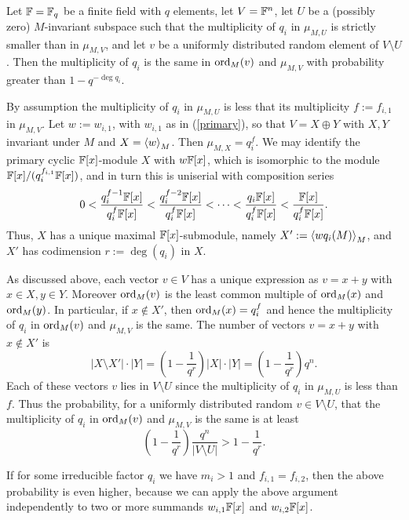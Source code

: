 \begin{Prop}
\label{ProbOneMult}
Let $\mathbb{F} = \mathbb{F}_q$ be a finite field with $q$ elements, let $V=\mathbb{F}^n$, let
$U$ be a (possibly zero) $M$-invariant subspace such that the multiplicity of
$q_i$ in $\mu_{M,U}$ is strictly smaller than in $\mu_{M,V}$, and let 
$v$ be a uniformly distributed random element of $V\setminus U$. Then 
the multiplicity of $q_i$ is the same in $\mathrm{ord}_M(v)$ and $\mu_{M,V}$ 
with probability greater than
$1-q^{-\deg q_i}$.
\end{Prop}
\proofbeg
By assumption the multiplicity of $q_i$ in $\mu_{M,U}$ 
is less that its multiplicity $f:=f_{i,1}$ in $\mu_{M,V}$. 
Let $w:=w_{i,1}$, with $w_{i,1}$ as in (\ref{primary}), so that $V=X\oplus Y$ with
$X, Y$ invariant under $M$ and $X=\left< w\right>_M$. Then $\mu_{M,X}=
q_i^{f}$. We may identify the primary cyclic $\mathbb{F}[x]$-module 
$X$ with  $w\mathbb{F}[x]$, which is
isomorphic to the module $\mathbb{F}[x]/(q_i^{f_{i,1}}\mathbb{F}[x])$,
and in turn this is uniserial with composition series
\[ 
0 <   \frac{q_i^{f-1}\mathbb{F}[x]}{q_i^{f}\mathbb{F}[x]}
     <   \frac{q_i^{f-2}\mathbb{F}[x]}{q_i^{f}\mathbb{F}[x]} <
\cdots <  \frac{q_i\mathbb{F}[x]}{q_i^{f}\mathbb{F}[x]} 
       < \frac{\mathbb{F}[x]}{q_i^{f}\mathbb{F}[x]}. 
\]
Thus, $X$ has a unique maximal $\mathbb{F}[x]$-submodule, namely  $X':=\left< w q_i(M)\right>_M$,
and $X'$ has codimension $r:=\deg(q_i)$ in $X$. 

As discussed above, each vector $v\in V$ has a 
unique expression as $v=x+y$ with $x\in X, y\in Y$. Moreover
$\mathrm{ord}_M(v)$ is the least common multiple of $\mathrm{ord}_M(x)$ and $\mathrm{ord}_M(y)$.
In particular, if $x\not\in X'$, then $\mathrm{ord}_M(x)=q_i^{f}$ and hence
the multiplicity of $q_i$ in $\mathrm{ord}_M(v)$ and $\mu_{M,V}$ is the same.
The number of vectors $v=x+y$ with $x\not\in X'$ is 
\[
|X\setminus X'|\cdot |Y|=(1-\frac{1}{q^r})|X|\cdot|Y|=(1-\frac{1}{q^r})q^n.
\]
Each of these vectors $v$ lies in $V\setminus U$ since the multiplicity of
$q_i$ in $\mu_{M,U}$ is less than $f$. Thus the probability, for
a uniformly distributed random $v\in V\setminus U$, that the multiplicity 
of $q_i$ in $\mathrm{ord}_M(v)$ and $\mu_{M,V}$ is the same is at least
\[
(1-\frac{1}{q^r})\frac{q^n}{|V\setminus U|} > 1-\frac{1}{q^r}.
\]
\proofend

\begin{Rem}
If for some irreducible factor $q_i$ we have $m_i > 1$
and $f_{i,1} = f_{i,2}$, then the above probability is even higher,
because we can apply the above argument independently to two or more summands
$w_{i,1}\mathbb{F}[x]$ and $w_{i,2}\mathbb{F}[x]$.
\end{Rem}


